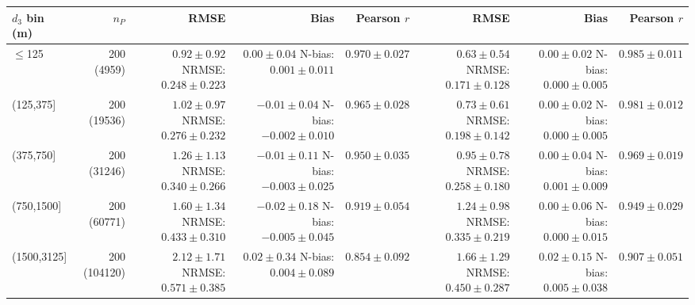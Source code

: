 \begin{table}[p]
{\begin{tabular}{lrrrrrrr}
\cmidrule(lr){3-5}\cmidrule(lr){6-8}
$d_3$ bin (m) & $n_P$ & RMSE & Bias & Pearson $r$ & RMSE & Bias & Pearson $r$\\
\midrule
$\leq$125 & 200 (4959) & \shortstack[c]{$0.92\pm 0.92$\\[-2pt]{\tiny NRMSE: $0.248\pm 0.223$}} & \shortstack[c]{$0.00\pm 0.04$\\[-2pt]{\tiny N-bias: $0.001\pm 0.011$}} & $0.970\pm 0.027$ & \shortstack[c]{$0.63\pm 0.54$\\[-2pt]{\tiny NRMSE: $0.171\pm 0.128$}} & \shortstack[c]{$0.00\pm 0.02$\\[-2pt]{\tiny N-bias: $0.000\pm 0.005$}} & $0.985\pm 0.011$\\
(125,375] & 200 (19536) & \shortstack[c]{$1.02\pm 0.97$\\[-2pt]{\tiny NRMSE: $0.276\pm 0.232$}} & \shortstack[c]{$-0.01\pm 0.04$\\[-2pt]{\tiny N-bias: $-0.002\pm 0.010$}} & $0.965\pm 0.028$ & \shortstack[c]{$0.73\pm 0.61$\\[-2pt]{\tiny NRMSE: $0.198\pm 0.142$}} & \shortstack[c]{$0.00\pm 0.02$\\[-2pt]{\tiny N-bias: $0.000\pm 0.005$}} & $0.981\pm 0.012$\\
(375,750] & 200 (31246) & \shortstack[c]{$1.26\pm 1.13$\\[-2pt]{\tiny NRMSE: $0.340\pm 0.266$}} & \shortstack[c]{$-0.01\pm 0.11$\\[-2pt]{\tiny N-bias: $-0.003\pm 0.025$}} & $0.950\pm 0.035$ & \shortstack[c]{$0.95\pm 0.78$\\[-2pt]{\tiny NRMSE: $0.258\pm 0.180$}} & \shortstack[c]{$0.00\pm 0.04$\\[-2pt]{\tiny N-bias: $0.001\pm 0.009$}} & $0.969\pm 0.019$\\
(750,1500] & 200 (60771) & \shortstack[c]{$1.60\pm 1.34$\\[-2pt]{\tiny NRMSE: $0.433\pm 0.310$}} & \shortstack[c]{$-0.02\pm 0.18$\\[-2pt]{\tiny N-bias: $-0.005\pm 0.045$}} & $0.919\pm 0.054$ & \shortstack[c]{$1.24\pm 0.98$\\[-2pt]{\tiny NRMSE: $0.335\pm 0.219$}} & \shortstack[c]{$0.00\pm 0.06$\\[-2pt]{\tiny N-bias: $0.000\pm 0.015$}} & $0.949\pm 0.029$\\
(1500,3125] & 200 (104120) & \shortstack[c]{$2.12\pm 1.71$\\[-2pt]{\tiny NRMSE: $0.571\pm 0.385$}} & \shortstack[c]{$0.02\pm 0.34$\\[-2pt]{\tiny N-bias: $0.004\pm 0.089$}} & $0.854\pm 0.092$ & \shortstack[c]{$1.66\pm 1.29$\\[-2pt]{\tiny NRMSE: $0.450\pm 0.287$}} & \shortstack[c]{$0.02\pm 0.15$\\[-2pt]{\tiny N-bias: $0.005\pm 0.038$}} & $0.907\pm 0.051$\\

\end{tabular}}
\end{table}

